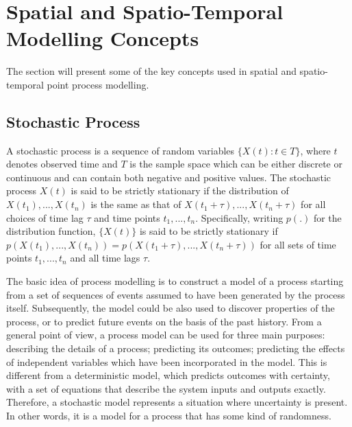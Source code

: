 \section{Spatial and Spatio-Temporal Modelling Concepts}

The section will present some of the key concepts used in spatial and spatio-temporal point process modelling.

\subsection{Stochastic Process} \label{2.3.1}
 
A stochastic process is a sequence of random variables $\lbrace X(t):t\in T \rbrace$, where $t$ denotes observed time and $T$ is the sample space which can be either discrete or continuous and can contain both negative and positive values. The stochastic process $X(t)$ is said to be strictly stationary if the distribution of $X(t_1),...,X(t_n)$ is the same as that of  $X(t_1 + \tau),...,X(t_n + \tau)$ for all choices of time lag $\tau$ and time points $t_1,...,t_n$. Specifically, writing $p(.)$ for the distribution function, $\lbrace X(t)\rbrace$ is said to be strictly stationary if $p(X(t_1),...,X(t_n)) = p(X(t_1 + \tau),...,X(t_n + \tau))$ for all sets of time points $t_1,...,t_n$ and all time lags $\tau$.

The basic idea of process modelling is to construct a model of a process starting from a set of sequences of events assumed to have been generated by the process itself. Subsequently, the model could be also used to discover properties of the process, or to predict future events on the basis of the past history. From a general point of view, a process model can be used for three main purposes: describing the details of a process; predicting its outcomes; predicting the effects of independent variables which have been incorporated in the model. This is different from a deterministic model, which predicts outcomes with certainty, with a set of equations that describe the system inputs and outputs exactly. Therefore, a stochastic model represents a situation where uncertainty is present. In other words, it is a model for a process that has some kind of randomness.

